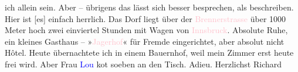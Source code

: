                ich allein sein. Aber – übrigens das lässt sich besser besprechen, als beschreiben.
               Hier ist {\pb}{[}es{]} einfach herrlich. Das Dorf liegt über der \textcolor{pink}{Brennerstrasse}{}\ledrightnote{\textcolor{pink}{Brenner}}{ } über 1000 Meter hoch zwei einviertel Stunden mit
               Wagen von \textcolor{pink}{Innsbruck}{}\ledrightnote{\textcolor{pink}{Innsbruck}}. Absolute Ruhe, ein kleines
               Gasthaus – »\textcolor{pink}{Jagerhof}{}\ledrightnote{\textcolor{pink}{Gasthaus Jagerhof}}« für Fremde eingerichtet, aber
               absolut nicht Hôtel. Heute übernachtete ich in einem Bauernhof, weil mein Zimmer erst
               heute frei wird. Aber Frau \textcolor{blue}{Lou}{}\ledrightnote{\textcolor{blue}{Lou Andreas-Salomé}} ko{\geminationm}t soeben an den Tisch. Adieu.\pend
           \pstart Herzlichst \spacefill\mbox{Richard}\pend{}\endnumbering{}  
      